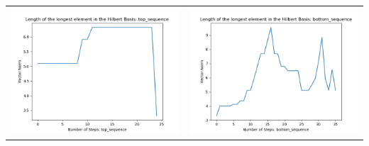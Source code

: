 \documentclass[10pt]{article}
\begin{document}
\begin{tabular}{c|c}
\begin{minipage}{.4\textwidth}
\includegraphics[width=\textwidth]{"DATA/5d/6 generators 2 bound H/top_sequence LENGTH"}
\end{minipage} &
\begin{minipage}{.4\textwidth}
\includegraphics[width=\textwidth]{"DATA/5d/6 generators 2 bound H bottomup/bottom_sequence LENGTH"}
\end{minipage}
\end{tabular}
\end{document}
